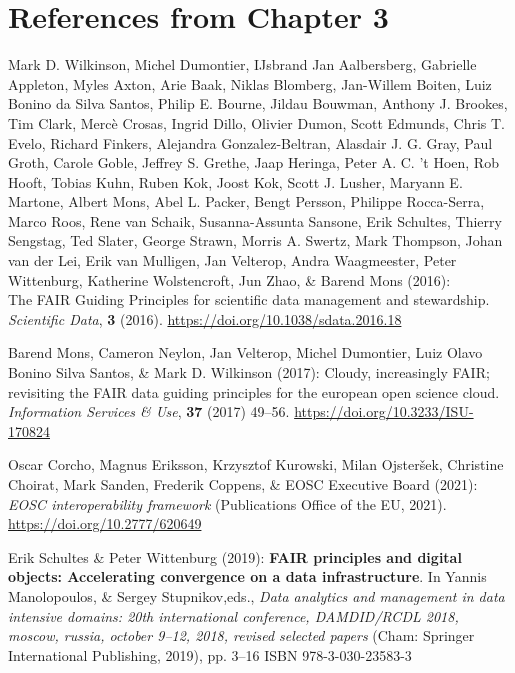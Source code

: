 
\section{References from Chapter 3}

\begin{thebibliography}{9}
   
Mark D. Wilkinson, Michel Dumontier, IJsbrand Jan Aalbersberg, Gabrielle
Appleton, Myles Axton, Arie Baak, Niklas Blomberg, Jan-Willem Boiten,
Luiz Bonino da Silva Santos, Philip E. Bourne, Jildau Bouwman, Anthony
J. Brookes, Tim Clark, Mercè Crosas, Ingrid Dillo, Olivier Dumon, Scott
Edmunds, Chris T. Evelo, Richard Finkers, Alejandra Gonzalez-Beltran,
Alasdair J. G. Gray, Paul Groth, Carole Goble, Jeffrey S. Grethe, Jaap
Heringa, Peter A. C. 't Hoen, Rob Hooft, Tobias Kuhn, Ruben Kok, Joost
Kok, Scott J. Lusher, Maryann E. Martone, Albert Mons, Abel L. Packer,
Bengt Persson, Philippe Rocca-Serra, Marco Roos, Rene van Schaik,
Susanna-Assunta Sansone, Erik Schultes, Thierry Sengstag, Ted Slater,
George Strawn, Morris A. Swertz, Mark Thompson, Johan van der Lei, Erik
van Mulligen, Jan Velterop, Andra Waagmeester, Peter Wittenburg,
Katherine Wolstencroft, Jun Zhao, \& Barend Mons (2016):\\The {FAIR
Guiding Principles} for scientific data management and stewardship.
\emph{Scientific Data}, \textbf{3} (2016).
\url{https://doi.org/10.1038/sdata.2016.18}

Barend Mons, Cameron Neylon, Jan Velterop, Michel Dumontier, Luiz Olavo
Bonino Silva Santos, \& Mark D. Wilkinson (2017): Cloudy, increasingly
{FAIR}; revisiting the {FAIR} data guiding principles for the european
open science cloud. \emph{Information Services \& Use}, \textbf{37}
(2017) 49--56.
\url{https://doi.org/10.3233/ISU-170824}

Oscar Corcho, Magnus Eriksson, Krzysztof Kurowski, Milan Ojsteršek,
Christine Choirat, Mark Sanden, Frederik Coppens, \& EOSC Executive
Board (2021): \emph{{EOSC} interoperability framework} ({Publications
Office of the EU}, 2021).
\url{https://doi.org/10.2777/620649}

Erik Schultes \& Peter Wittenburg (2019): \textbf{{FAIR} principles and
digital objects: {Accelerating} convergence on a data infrastructure}.
In Yannis Manolopoulos, \& Sergey Stupnikov,eds., \emph{Data analytics
and management in data intensive domains: 20th international conference,
{DAMDID}/{RCDL} 2018, moscow, russia, october 9--12, 2018, revised
selected papers} ({Cham}: {Springer International Publishing}, 2019),
pp. 3--16 ISBN 978-3-030-23583-3


\end{thebibliography}
